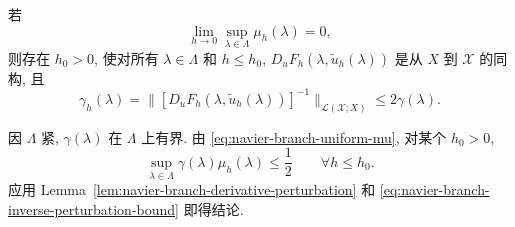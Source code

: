 \setcounter{statement}{3}
\begin{Lemma}\label{lem:navier-branch-uniform-isomorphism}
若
\begin{equation}\label{eq:navier-branch-uniform-mu}
\lim_{h\to0}\sup_{\lambda\in\Lambda}\mu_h(\lambda)=0,
\end{equation}
则存在 $h_0>0$, 使对所有 $\lambda\in\Lambda$ 和 $h\leq h_0$,
$D_uF_h(\lambda,\widetilde u_h(\lambda))$ 是从 $X$ 到 $\mathscr X$ 的同构, 且
\begin{equation}\label{eq:navier-branch-uniform-gamma}
\gamma_h(\lambda)=
\|[D_uF_h(\lambda,\widetilde u_h(\lambda))]^{-1}\|_{\mathcal L(\mathscr X;X)}
\leq2\gamma(\lambda).
\end{equation}
\end{Lemma}
\begin{Proof}
因 $\Lambda$ 紧, $\gamma(\lambda)$ 在 $\Lambda$ 上有界.
由 \eqref{eq:navier-branch-uniform-mu}, 对某个 $h_0>0$,
\[
\sup_{\lambda\in\Lambda}\gamma(\lambda)\mu_h(\lambda)\leq\frac12
\qquad\forall h\leq h_0.
\]
应用 Lemma~\ref{lem:navier-branch-derivative-perturbation} 和
\eqref{eq:navier-branch-inverse-perturbation-bound} 即得结论.
\end{Proof}

